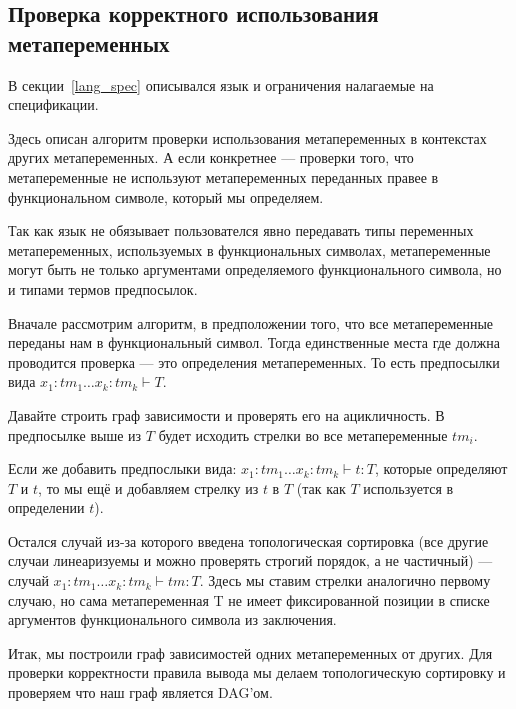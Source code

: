 \subsection{Проверка корректного использования метапеременных}\label{toposort}
В секции~\ref{lang_spec} описывался язык и ограничения налагаемые на спецификации.

Здесь описан алгоритм проверки использования метапеременных в контекстах других метапеременных. А если конкретнее --- проверки того, что метапеременные не используют метапеременных переданных правее в функциональном символе, который мы определяем.

Так как язык не обязывает пользователся явно передавать типы переменных метапеременных, используемых в функциональных символах, метапеременные могут быть не только аргументами определяемого функционального символа, но и типами термов предпосылок.

Вначале рассмотрим алгоритм, в предположении того, что все метапеременные переданы нам в функциональный символ. Тогда единственные места где должна проводится проверка --- это определения метапеременных. То есть предпосылки вида $x_1 : tm_1 \ldots x_k : tm_k  \vdash T$.

Давайте строить граф зависимости и проверять его на ацикличность. В предпосылке выше из $T$ будет исходить стрелки во все метапеременные $tm_i$.

Если же добавить предпослыки вида: $x_1 : tm_1 \ldots x_k : tm_k  \vdash t : T$, которые определяют $T$ и $t$, то мы ещё и добавляем стрелку из $t$ в $T$ (так как $T$ используется в определении $t$).

Остался случай из-за которого введена топологическая сортировка (все другие случаи линеаризуемы и можно проверять строгий порядок, а не частичный) --- случай $x_1 : tm_1 \ldots x_k : tm_k  \vdash tm : T$. Здесь мы ставим стрелки аналогично первому случаю, но сама метапеременная T не имеет фиксированной позиции в списке аргументов функционального символа из заключения.

Итак, мы построили граф зависимостей одних метапеременных от других. Для проверки корректности правила вывода мы делаем топологическую сортировку и проверяем что наш граф является DAG'ом.

























